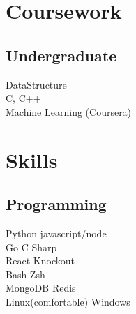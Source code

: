\documentclass[]{deedy-resume-openfont}
\begin{document}
\begin{minipage}[t]{0.33\textwidth}

\section{Coursework}

\subsection{Undergraduate}
DataStructure \\
C, C++ \\
Machine Learning (Coursera) \\
\sectionsep


\section{Skills}
\subsection{Programming}
\textbullet{} Python \textbullet{} javascript/node \\
\textbullet{} Go \textbullet{} C Sharp \\
\textbullet{} React \textbullet{} Knockout \\
\textbullet{} Bash \textbullet{} Zsh \\
\textbullet{} MongoDB \textbullet{} Redis \\
Linux(comfortable) \textbullet{} Windows \\
\sectionsep



\end{minipage}
\end{document}
